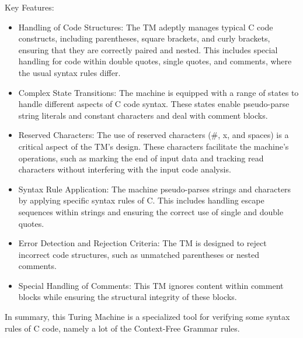 \documentclass{article}
\begin{document}
Key Features:

\begin{itemize}
\item Handling of Code Structures: The TM adeptly manages typical C code constructs, including parentheses, square brackets, and curly brackets, ensuring that 
they are correctly paired and nested. This includes special handling for code within double quotes, single quotes, and comments, where the usual syntax rules differ. 
\item  Complex State Transitions: The machine is equipped with a range of states to handle different aspects of C code syntax. These states enable pseudo-parse string 
literals and constant characters and deal with comment blocks. 
\item Reserved Characters: The use of reserved characters ($\#$, x, and spaces) is a critical aspect of the TM's design. These characters facilitate the machine's operations, 
such as marking the end of input data and tracking read characters without interfering with the input code analysis.
\item Syntax Rule Application: The machine pseudo-parses strings and characters by applying specific syntax rules of C. This includes handling escape sequences within 
strings and ensuring the correct use of single and double quotes. 
\item Error Detection and Rejection Criteria: The TM is designed to reject incorrect code structures, such as unmatched parentheses or nested comments. 
\item Special Handling of Comments: This TM ignores content within comment blocks while ensuring the structural integrity of these blocks.
\end{itemize}

In summary, this Turing Machine is a specialized tool for verifying some syntax rules of C code, namely a lot of the Context-Free Grammar rules.
\end{document}
